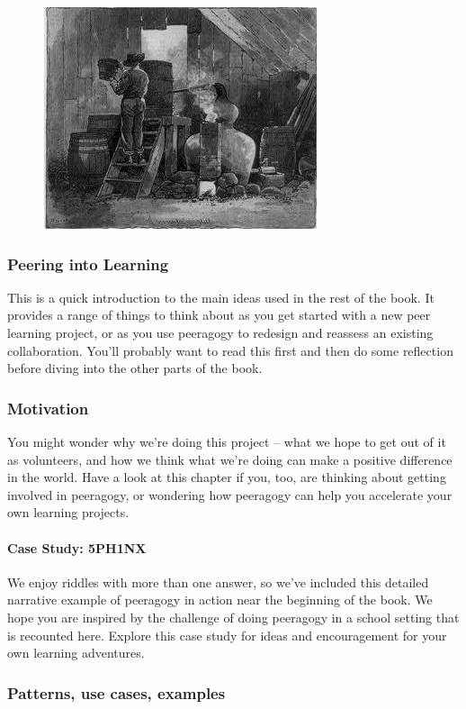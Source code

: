 \begin{figure}[htbp]
\centering
\includegraphics[width=.4\textwidth]{../pictures/moonshine.jpg}
\end{figure}

\subsubsection{Peering into Learning}

\noindent This is a quick introduction to the main ideas used in the rest of the
book. It provides a range of things to think about as you get started
with a new peer learning project, or as you use peeragogy to redesign
and reassess an existing collaboration. You'll probably want to read
this first and then do some reflection before diving into the other
parts of the book.

\subsubsection{Motivation}
You might wonder why we're doing this project -- what we hope to get
out of it as volunteers, and how we think what we're doing can make a
positive difference in the world. Have a look at this chapter if you,
too, are thinking about getting involved in peeragogy, or wondering
how peeragogy can help you accelerate your own learning projects.

\paragraph{Case Study: 5PH1NX}
We enjoy riddles with more than one answer, so we've included this
detailed narrative example of peeragogy in action near the beginning
of the book. We hope you are inspired by the challenge of doing
peeragogy in a school setting that is recounted here. Explore this
case study for ideas and encouragement for your own learning
adventures.

\subsubsection{Patterns, use cases, examples}

